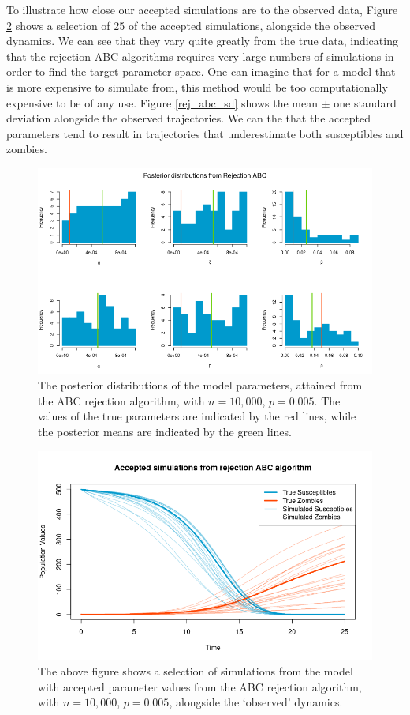\documentclass[]{article}
\begin{document}
To illustrate how close our accepted simulations are to the observed data, Figure \ref{rej_abc_acc_simulations} shows a selection of 25 of the accepted simulations, alongside the observed dynamics. We can see that they vary quite greatly from the true data, indicating that the rejection ABC algorithms requires very large numbers of simulations in order to find the target parameter space. One can imagine that for a model that is more expensive to simulate from, this method would be too computationally expensive to be of any use. Figure \ref{rej_abc_sd} shows the mean $\pm$ one standard deviation alongside the observed trajectories. We can the that the accepted parameters tend to result in trajectories that underestimate both susceptibles and zombies.

\begin{figure}[H]
	\centering
	\includegraphics[width=0.95\linewidth]{../Figures/rejection_posteriors}
	\caption{The posterior distributions of the model parameters, attained from the ABC rejection algorithm, with $n=10,000$, $p=0.005$. The values of the true parameters are indicated by the red lines, while the posterior means are indicated by the green lines.}
	\label{rej_abc_posteriors}
\end{figure}

\begin{figure}[H]
\centering
\includegraphics[width=0.8\linewidth]{../Figures/rej_ABC_simulations}
\caption{The above figure shows a selection of simulations from the model with accepted parameter values from the ABC rejection algorithm, with $n=10,000$, $p=0.005$, alongside the `observed' dynamics.}
\label{rej_abc_acc_simulations}
\end{figure}
\end{document}

